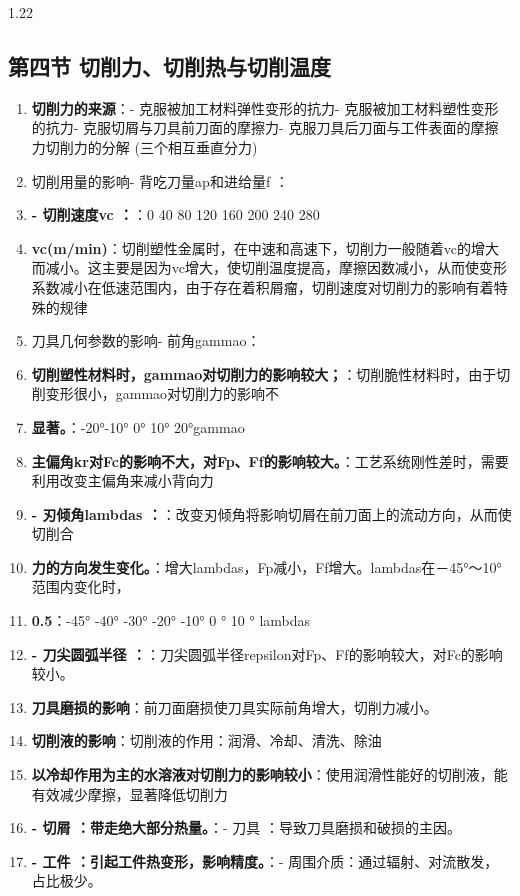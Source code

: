 \documentclass[12pt,a4paper]{article}
\begin{document}
\begin{spacing}{1.22}
\subsection{第四节 切削力、切削热与切削温度}
\begin{tcolorbox}[colback=yellow!6,colframe=red!55!black,title=重点,left=1mm,right=1mm]
\begin{enumerate}[leftmargin=2.2em,label=\arabic*.]
  \item \textbf{切削力的来源}：- 克服被加工材料弹性变形的抗力- 克服被加工材料塑性变形的抗力- 克服切屑与刀具前刀面的摩擦力- 克服刀具后刀面与工件表面的摩擦力切削力的分解 (三个相互垂直分力)
  \item 切削用量的影响- 背吃刀量ap和进给量f ：
  \item \textbf{- 切削速度vc ：}：0 40 80 120 160 200 240 280
  \item \textbf{vc(m/min)}：切削塑性金属时，在中速和高速下，切削力一般随着vc的增大而减小。这主要是因为vc增大，使切削温度提高，摩擦因数减小，从而使变形系数减小在低速范围内，由于存在着积屑瘤，切削速度对切削力的影响有着特殊的规律
  \item 刀具几何参数的影响- 前角gammao：
  \item \textbf{切削塑性材料时，gammao对切削力的影响较大；}：切削脆性材料时，由于切削变形很小，gammao对切削力的影响不
  \item \textbf{显著。}：-20°-10° 0° 10° 20°gammao
  \item \textbf{主偏角kr对Fc的影响不大，对Fp、Ff的影响较大。}：工艺系统刚性差时，需要利用改变主偏角来减小背向力
  \item \textbf{- 刃倾角lambdas ：}：改变刃倾角将影响切屑在前刀面上的流动方向，从而使切削合
  \item \textbf{力的方向发生变化。}：增大lambdas，Fp减小，Ff增大。lambdas在－45°～10°范围内变化时，
  \item \textbf{0.5}：-45° -40° -30° -20° -10° 0 ° 10 ° lambdas
  \item \textbf{- 刀尖圆弧半径 ：}：刀尖圆弧半径repsilon对Fp、Ff的影响较大，对Fc的影响较小。
  \item \textbf{刀具磨损的影响}：前刀面磨损使刀具实际前角增大，切削力减小。
  \item \textbf{切削液的影响}：切削液的作用：润滑、冷却、清洗、除油
  \item \textbf{以冷却作用为主的水溶液对切削力的影响较小}：使用润滑性能好的切削液，能有效减少摩擦，显著降低切削力
  \item \textbf{- 切屑 ：带走绝大部分热量。}：- 刀具 ：导致刀具磨损和破损的主因。
  \item \textbf{- 工件 ：引起工件热变形，影响精度。}：- 周围介质：通过辐射、对流散发，占比极少。

\end{enumerate}
\end{tcolorbox}
\end{spacing}
\end{document}
